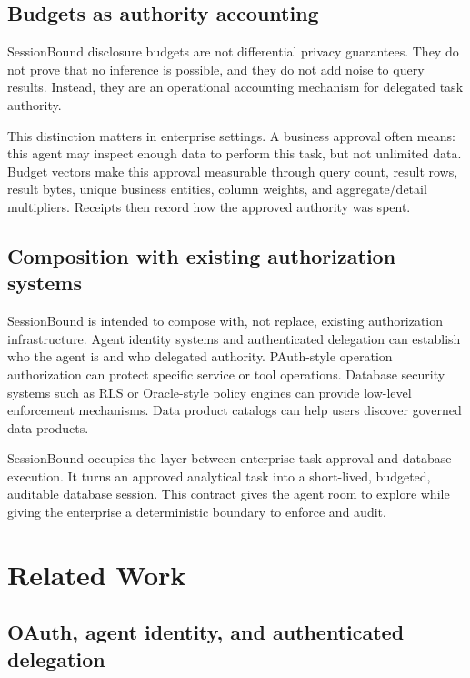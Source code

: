 \documentclass[
]{article}
\begin{document}
\hypertarget{budgets-as-authority-accounting}{%
\subsection{Budgets as authority
accounting}\label{budgets-as-authority-accounting}}

SessionBound disclosure budgets are not differential privacy guarantees.
They do not prove that no inference is possible, and they do not add
noise to query results. Instead, they are an operational accounting
mechanism for delegated task authority.

This distinction matters in enterprise settings. A business approval
often means: this agent may inspect enough data to perform this task,
but not unlimited data. Budget vectors make this approval measurable
through query count, result rows, result bytes, unique business
entities, column weights, and aggregate/detail multipliers. Receipts then
record how the approved authority was spent.

\hypertarget{composition-with-existing-authorization-systems}{%
\subsection{Composition with existing authorization
systems}\label{composition-with-existing-authorization-systems}}

SessionBound is intended to compose with, not replace, existing
authorization infrastructure. Agent identity systems and authenticated
delegation can establish who the agent is and who delegated authority.
PAuth-style operation authorization can protect specific service or tool
operations. Database security systems such as RLS or Oracle-style policy
engines can provide low-level enforcement mechanisms. Data product
catalogs can help users discover governed data products.

SessionBound occupies the layer between enterprise task approval and
database execution. It turns an approved analytical task into a
short-lived, budgeted, auditable database session. This contract gives
the agent room to explore while giving the enterprise a deterministic
boundary to enforce and audit.


\hypertarget{related-work}{%
\section{Related Work}\label{related-work}}

\hypertarget{oauth-agent-identity-and-authenticated-delegation}{%
\subsection{OAuth, agent identity, and authenticated
delegation}\label{oauth-agent-identity-and-authenticated-delegation}}
\end{document}
